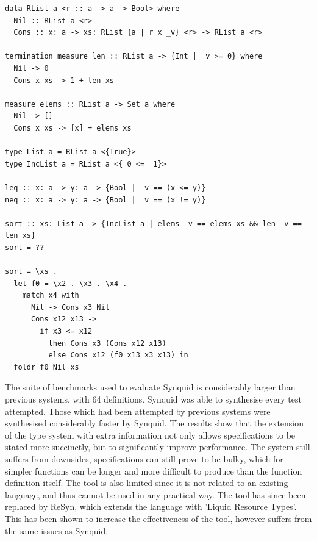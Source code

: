 \documentclass[a4paper]{article}
\begin{document}
\begin{center}
\begin{verbatim}
data RList a <r :: a -> a -> Bool> where
  Nil :: RList a <r>
  Cons :: x: a -> xs: RList {a | r x _v} <r> -> RList a <r>

termination measure len :: RList a -> {Int | _v >= 0} where
  Nil -> 0
  Cons x xs -> 1 + len xs  

measure elems :: RList a -> Set a where
  Nil -> []
  Cons x xs -> [x] + elems xs  

type List a = RList a <{True}>
type IncList a = RList a <{_0 <= _1}>  

leq :: x: a -> y: a -> {Bool | _v == (x <= y)}
neq :: x: a -> y: a -> {Bool | _v == (x != y)} 

sort :: xs: List a -> {IncList a | elems _v == elems xs && len _v == len xs}
sort = ??

sort = \xs .
  let f0 = \x2 . \x3 . \x4 .
	match x4 with
	  Nil -> Cons x3 Nil
	  Cons x12 x13 ->
		if x3 <= x12
		  then Cons x3 (Cons x12 x13)
		  else Cons x12 (f0 x13 x3 x13) in
  foldr f0 Nil xs
\end{verbatim}
\end{center}

The suite of benchmarks used to evaluate Synquid is considerably larger than previous systems, with 64 definitions.
Synquid was able to synthesise every test attempted. Those which had been attempted by previous systems were synthesised 
considerably faster by Synquid. The results show that the extension of the type system with extra information not only allows
specifications to be stated more succinctly, but to significantly improve performance. The system still suffers from downsides, 
specifications can still prove to be bulky, which for simpler functions can be longer and more difficult to produce than the 
function definition itself. The tool is also limited since it is not related to an existing language, and thus cannot be used in
any practical way. The tool has since been replaced by ReSyn, which extends the language with 'Liquid Resource Types'. This has
been shown to increase the effectiveness of the tool, however suffers from the same issues as Synquid.
\end{document}
